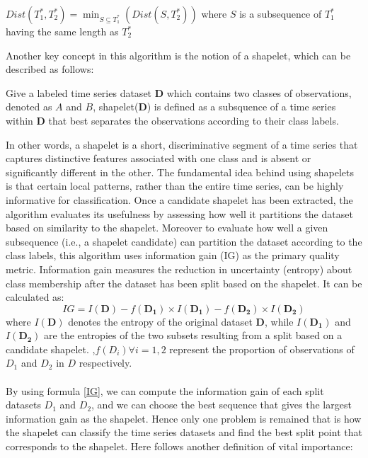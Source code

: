 \begin{definition}\label{def:Dist}%
$Dist(T_1^*,T_2^*)=\min_{S\subseteq T_1^*}(Dist(S,T_2^*))$ where $S$ is a subsequence of $T_1^*$ having the same length as $T_2^*$ 
\end{definition}%
\noindent Another key concept in this algorithm is the notion of a shapelet, which can be described as follows:
\begin{definition}[Shapelet]\label{def:shapelet}%
	Give a labeled time series dataset $\boldsymbol{D}$ which contains two classes of observations, denoted as $A$ and $B$, shapelet($\boldsymbol{D}$) is defined as a subsquence of a time series within $\boldsymbol{D}$ that best separates the observations according to their class labels.
\end{definition}%
\noindent In other words, a shapelet is a short, discriminative segment of a time series that captures distinctive features associated with one class and is absent or significantly different in the other. The fundamental idea behind using shapelets is that certain local patterns, rather than the entire time series, can be highly informative for classification. Once a candidate shapelet has been extracted, the algorithm evaluates its usefulness by assessing how well it partitions the dataset based on similarity to the shapelet. Moreover to evaluate how well a given subsequence (i.e., a shapelet candidate) can partition the dataset according to the class labels, this algorithm uses information gain (IG) as the primary quality metric. Information gain measures the reduction in uncertainty (entropy) about class membership after the dataset has been split based on the shapelet. It can be calculated as:\\
\begin{equation}
	IG=I(\boldsymbol{D})-f(\boldsymbol{D_1})\times I(\boldsymbol{D_1})-f(\boldsymbol{D_2})\times I(\boldsymbol{D_2})
	\label{IG}
\end{equation}
where $I(\boldsymbol{D})$ denotes the entropy of the original dataset $\boldsymbol{D}$, while $I(\boldsymbol{D_1})$ and $I(\boldsymbol{D_2})$ are the entropies of the two subsets resulting from a split based on a candidate shapelet. ,$f(D_i) \forall i=1,2$ represent the proportion of observations of $D_1$ and $D_2$ in $D$ respectively.\\
\\
By using formula \eqref{IG}, we can compute the information gain of each split datasets $D_1$ and $D_2$, and we can choose the best sequence that gives the largest information gain as the shapelet. Hence only one problem is remained that is how the shapelet can classify the time series datasets and find the best split point that corresponds to the shapelet. Here follows another definition of vital importance:
